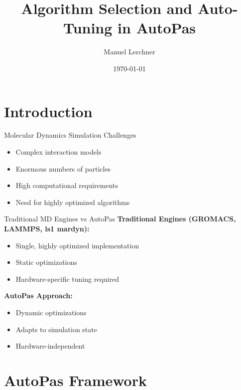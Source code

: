 \documentclass[
	10pt,
	t		%
]{beamer}
\title{Algorithm Selection and Auto-Tuning in AutoPas}
\author{Manuel Lerchner}
\date{\today}
\begin{document}
\maketitle

\setcounter{framenumber}{0}

\section{Introduction}

\begin{frame}{Molecular Dynamics Simulation Challenges}
    \begin{itemize}
        \item Complex interaction models
        \item Enormous numbers of particles
        \item High computational requirements
        \item Need for highly optimized algorithms
    \end{itemize}
\end{frame}

\begin{frame}{Traditional MD Engines vs AutoPas}
    \textbf{Traditional Engines (GROMACS, LAMMPS, ls1 mardyn):}
    \begin{itemize}
        \item Single, highly optimized implementation
        \item Static optimizations
        \item Hardware-specific tuning required
    \end{itemize}
    \vspace{0.5cm}
    \textbf{AutoPas Approach:}
    \begin{itemize}
        \item Dynamic optimizations
        \item Adapts to simulation state
        \item Hardware-independent
    \end{itemize}
\end{frame}

\section{AutoPas Framework}
\end{document}
